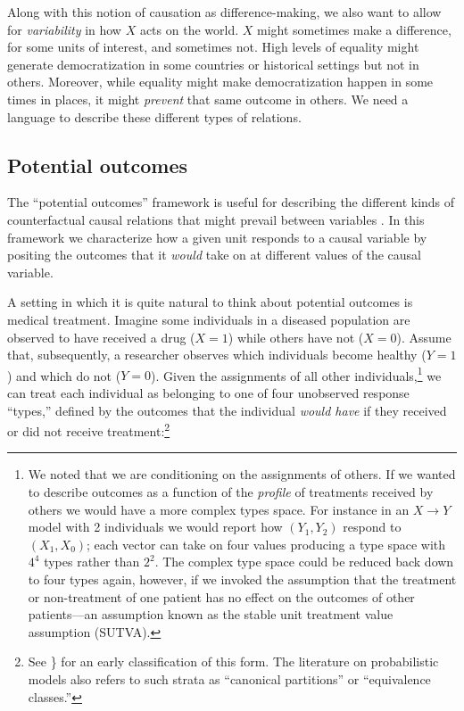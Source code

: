 \documentclass[
  12pt,
]{book}
\begin{document}
Along with this notion of causation as difference-making, we also want to allow for \emph{variability} in how \(X\) acts on the world. \(X\) might sometimes make a difference, for some units of interest, and sometimes not. High levels of equality might generate democratization in some countries or historical settings but not in others. Moreover, while equality might make democratization happen in some times in places, it might \emph{prevent} that same outcome in others. We need a language to describe these different types of relations.

\hypertarget{potential-outcomes}{%
\subsection{Potential outcomes}\label{potential-outcomes}}

The ``potential outcomes'' framework is useful for describing the different kinds of counterfactual causal relations that might prevail between variables \citet{Rubin1974}. In this framework we characterize how a given unit responds to a causal variable by positing the outcomes that it \emph{would} take on at different values of the causal variable.

A setting in which it is quite natural to think about potential outcomes is medical treatment. Imagine some individuals in a diseased population are observed to have received a drug (\(X=1\)) while others have not (\(X=0\)). Assume that, subsequently, a researcher observes which individuals become healthy (\(Y=1\)) and which do not (\(Y=0\)). Given the assignments of all other individuals,\footnote{We noted that we are conditioning on the assignments of others. If we wanted to describe outcomes as a function of the \emph{profile} of treatments received by others we would have a more complex types space. For instance in an \(X \rightarrow Y\) model with 2 individuals we would report how \((Y_1, Y_2)\) respond to \((X_1,X_0)\); each vector can take on four values producing a type space with \(4^4\) types rather than \(2^2\). The complex type space could be reduced back down to four types again, however, if we invoked the assumption that the treatment or non-treatment of one patient has no effect on the outcomes of other patients---an assumption known as the stable unit treatment value assumption (SUTVA).} we can treat each individual as belonging to one of four unobserved response ``types,'' defined by the outcomes that the individual \emph{would have} if they received or did not receive treatment:\footnote{See \citet{copas1973randomization}\} for an early classification of this form. The literature on probabilistic models also refers to such strata as ``canonical partitions'' or ``equivalence classes.''}
\end{document}
